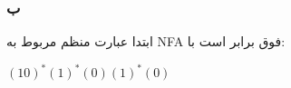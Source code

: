 \subsubsection*{ب}
ابتدا عبارت منظم مربوط به NFA فوق برابر است با:

\setLTR

 \textbf{$(10)^*(1)^*(0)(1)^*(0)$}
 
\setRTL



























